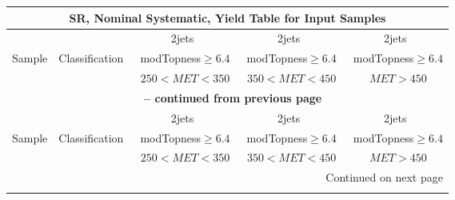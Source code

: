 \documentclass{article}
\begin{document}
\tiny




\begin{longtable}{|l|c|c|c|c|} 
 
\multicolumn{5}{c}{ SR, Nominal Systematic, Yield Table for Input Samples }\\* \hline 
 &  & 2jets  & 2jets  & 2jets \\* 
Sample & Classification  & ~modTopness$\ge6.4$  & ~modTopness$\ge6.4$  & ~modTopness$\ge6.4$ \\* 
 &  & ~$250<MET<350$  & ~$350<MET<450$  & ~$MET>450$ \\* 
\hline \hline 
\endfirsthead 
 
\multicolumn{5}{c}{{\bfseries \tablename\ \thetable{} -- continued from previous page}}\\* \hline 
 &  & 2jets  & 2jets  & 2jets \\* 
Sample & Classification  & ~modTopness$\ge6.4$  & ~modTopness$\ge6.4$  & ~modTopness$\ge6.4$ \\* 
 &  & ~$250<MET<350$  & ~$350<MET<450$  & ~$MET>450$ \\* 
\hline \hline 
\endhead 
 
\multicolumn{5}{|r|}{{Continued on next page}}\\* \hline 
\endfoot 
 
 
\endlastfoot 
 

\end{longtable}
\end{document}
